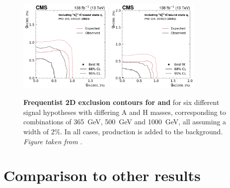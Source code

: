 \begin{figure}[!ph]
    \includegraphics[width=0.4\textwidth]{figures/ah/contour/A_m1000_w2p0__H_m365_w2p0_fc-contour.pdf}%
    \hspace*{0.05\textwidth}%
    \includegraphics[width=0.4\textwidth]{figures/ah/contour/A_m1000_w2p0__H_m500_w2p0_fc-contour.pdf}
    \caption{%
        \textbf{Frequentist 2D exclusion contours for \gAtt and \gHtt} for six different signal hypotheses with differing A and H masses, corresponding to combinations of \SI{365}{\GeV}, \SI{500}{\GeV} and \SI{1000}{\GeV}, all assuming a width of $2\%$. In all cases, \etat production is added to the background. \textit{Figure taken from }.
    }
    \label{fig:ah:limit_2D_ah_etat_1}
\end{figure}

\newpage

\section{Comparison to other results}
\label{sec:ah:comparison}


